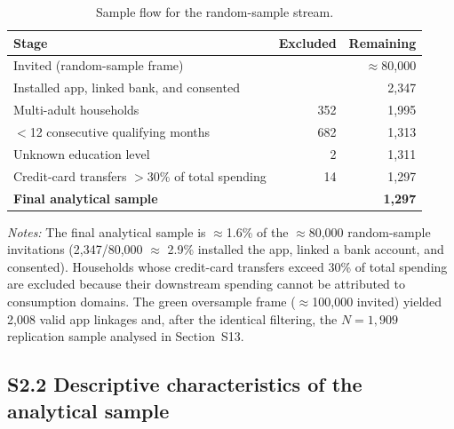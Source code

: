 \documentclass[12pt]{article}
\begin{document}
\begin{table}[ht]
\centering
\caption{Sample flow for the random-sample stream.}
\label{tab:sample_flow}
\begin{tabular}{@{}lrr@{}}
\toprule
Stage & Excluded & Remaining \\
\midrule
Invited (random-sample frame)               &      & $\approx$80{,}000 \\
Installed app, linked bank, and consented   &      & 2{,}347 \\
\midrule
\quad Multi-adult households                & 352  & 1{,}995 \\
\quad $<$12 consecutive qualifying months   & 682  & 1{,}313 \\
\quad Unknown education level               & 2    & 1{,}311 \\
\quad Credit-card transfers $>$30\% of total spending & 14 & 1{,}297 \\
\midrule
\textbf{Final analytical sample}            &      & \textbf{1{,}297} \\
\bottomrule
\end{tabular}

\smallskip
{\footnotesize\raggedright
\textit{Notes:} The final analytical sample is $\approx$1.6\% of the
$\approx$80{,}000 random-sample invitations (2{,}347/80{,}000 $\approx$ 2.9\% installed the app, linked a bank account, and consented). Households whose credit-card transfers exceed 30\% of total spending are excluded because their downstream spending cannot be attributed to consumption domains. The green oversample frame ($\approx$100{,}000 invited) yielded 2{,}008 valid app linkages and, after the identical filtering, the $N=1{,}909$ replication sample analysed in Section~S13.\par}
\end{table}

\subsection*{S2.2 Descriptive characteristics of the analytical sample}
\end{document}
